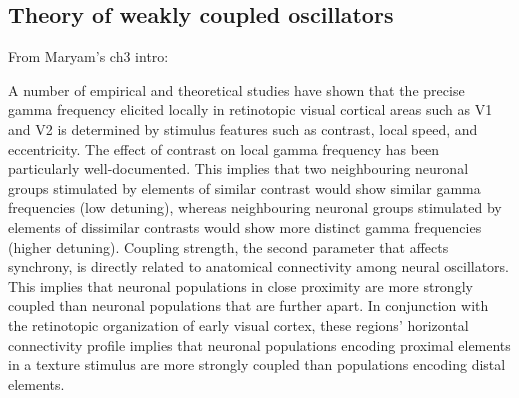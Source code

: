 \subsection{Theory of weakly coupled oscillators}
\label{sec:twco}


\begin{notes}
    From Maryam's ch3 intro:

    A number of empirical and theoretical studies have shown that the precise gamma frequency elicited locally in retinotopic visual cortical areas such as V1 and V2 is determined by stimulus features such as contrast, local speed, and eccentricity. The effect of contrast on local gamma frequency has been particularly well-documented. This implies that two neighbouring neuronal groups stimulated by elements of similar contrast would show similar gamma frequencies (low detuning), whereas neighbouring neuronal groups stimulated by elements of dissimilar contrasts would show more distinct gamma frequencies (higher detuning). Coupling strength, the second parameter that affects synchrony, is directly related to anatomical connectivity among neural oscillators. This implies that neuronal populations in close proximity are more strongly coupled than neuronal populations that are further apart. In conjunction with the retinotopic organization of early visual cortex, these regions’ horizontal connectivity profile implies that neuronal populations encoding proximal elements in a texture stimulus are more strongly coupled than populations encoding distal elements.
\end{notes}
